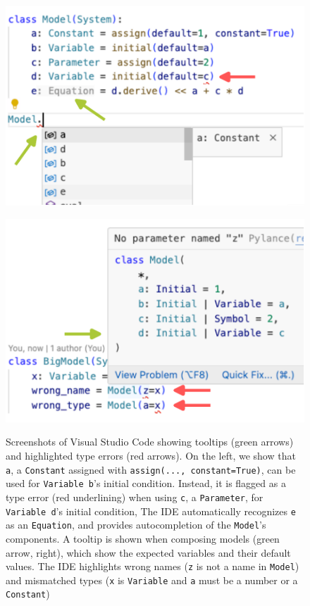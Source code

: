 \begin{figure}[t]

\begin{minipage}[b]{0.50\linewidth}
{
    \centering 
    \includegraphics{src/ide/ide1.pdf}
}
\end{minipage}%
%
\begin{minipage}[b]{0.50\linewidth}
{
    \centering
    \includegraphics{src/ide/ide2.pdf}
}
\end{minipage}%

\caption{
    \label{fig-ide}
    Screenshots of Visual Studio Code showing
    tooltips (green arrows) and
    highlighted type errors (red arrows).
    On the left,
    we show that \texttt{a},
    a \texttt{Constant} assigned with \texttt{assign(...,\ constant=True)},
    can be used for \texttt{Variable b}'s initial condition.
    Instead,
    it is flagged as a type error (red underlining)
    when using \texttt{c}, a \texttt{Parameter},
    for \texttt{Variable d}'s initial condition,
    The IDE automatically recognizes \texttt{e} as an \texttt{Equation},
    and provides autocompletion of the \texttt{Model}'s components.
    A tooltip is shown when composing models (green arrow, right),
    which show the expected variables and their default values.
    The IDE highlights wrong names (\texttt{z} is not a name in \texttt{Model})
    and mismatched types (\texttt{x} is \texttt{Variable} and \texttt{a} must be a number or a \texttt{Constant})
}

\end{figure}
